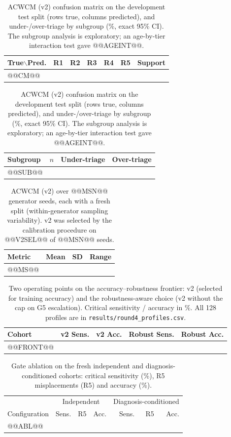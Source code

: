 \documentclass[11pt,a4paper]{article}%
\begin{document}
\begin{table}[h]
\caption{ACWCM (v2) confusion matrix on the development test split (rows true, columns predicted), and under-/over-triage by subgroup (\%, exact 95\% CI). The subgroup analysis is exploratory; an age-by-tier interaction test gave @@AGEINT@@.}\label{tab:cm}
\small
\begin{tabular}{@{}lrrrrrr@{}}
\toprule
True$\backslash$Pred. & R1 & R2 & R3 & R4 & R5 & Support \\
\midrule
@@CM@@
\bottomrule
\end{tabular}

\vspace{6pt}
\begin{tabular}{@{}lrll@{}}
\toprule
Subgroup & $n$ & Under-triage & Over-triage \\
\midrule
@@SUB@@
\bottomrule
\end{tabular}
\end{table}

\begin{table}[h]
\caption{ACWCM (v2) over @@MSN@@ generator seeds, each with a fresh split (within-generator sampling variability). v2 was selected by the calibration procedure on @@V2SEL@@ of @@MSN@@ seeds.}\label{tab:ms}
\small
\begin{tabular}{@{}lrrr@{}}
\toprule
Metric & Mean & SD & Range \\
\midrule
@@MS@@
\bottomrule
\end{tabular}
\end{table}

\begin{table}[h]
\caption{Two operating points on the accuracy--robustness frontier: v2 (selected for training accuracy) and the robustness-aware choice (v2 without the cap on G5 escalation). Critical sensitivity / accuracy in \%. All 128 profiles are in \texttt{results/round4\_profiles.csv}.}\label{tab:front}
\small
\begin{tabular}{@{}lrrrr@{}}
\toprule
Cohort & v2 Sens. & v2 Acc. & Robust Sens. & Robust Acc. \\
\midrule
@@FRONT@@
\bottomrule
\end{tabular}
\end{table}

\begin{table}[h]
\caption{Gate ablation on the fresh independent and diagnosis-conditioned cohorts: critical sensitivity (\%), R5 misplacements (R5) and accuracy (\%).}\label{tab:abl}
\small
\begin{tabular}{@{}lrrrrrr@{}}
\toprule
 & \multicolumn{3}{c}{Independent} & \multicolumn{3}{c}{Diagnosis-conditioned} \\
Configuration & Sens. & R5 & Acc. & Sens. & R5 & Acc. \\
\midrule
@@ABL@@
\bottomrule
\end{tabular}
\end{table}
\end{document}
